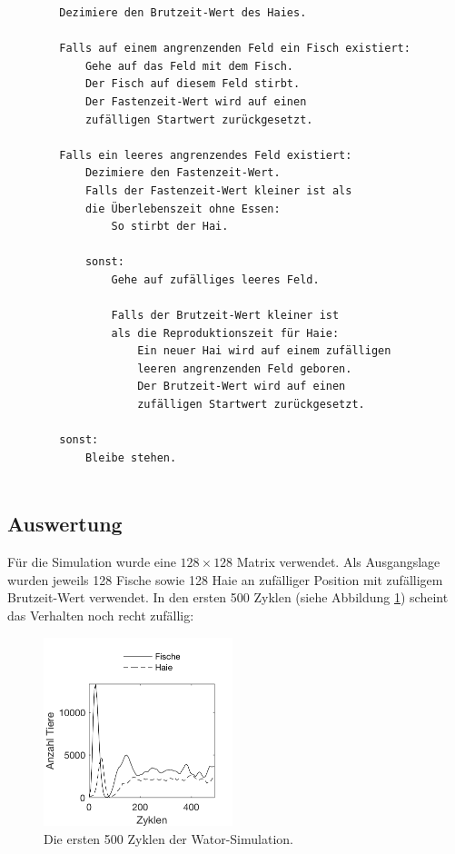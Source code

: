 \documentclass[a4paper,twoside]{article}
\begin{document}
	\begin{small}
	\begin{verbatim}
		Dezimiere den Brutzeit-Wert des Haies.
		
		Falls auf einem angrenzenden Feld ein Fisch existiert:
		    Gehe auf das Feld mit dem Fisch.
		    Der Fisch auf diesem Feld stirbt.
		    Der Fastenzeit-Wert wird auf einen
		    zufälligen Startwert zurückgesetzt.
		    
		Falls ein leeres angrenzendes Feld existiert:
		    Dezimiere den Fastenzeit-Wert.
		    Falls der Fastenzeit-Wert kleiner ist als 
		    die Überlebenszeit ohne Essen:
		        So stirbt der Hai.
		        
		    sonst:
		        Gehe auf zufälliges leeres Feld.
		        
		        Falls der Brutzeit-Wert kleiner ist
		        als die Reproduktionszeit für Haie:
		            Ein neuer Hai wird auf einem zufälligen
		            leeren angrenzenden Feld geboren.
		            Der Brutzeit-Wert wird auf einen
		            zufälligen Startwert zurückgesetzt.
		
		sonst:
		    Bleibe stehen. 
		
	\end{verbatim}
	\end{small}
	
	\newpage
	
	\subsection{Auswertung}
	Für die Simulation wurde eine \(128 \times 128\) Matrix verwendet. Als Ausgangslage wurden jeweils 128 Fische sowie 128 Haie an zufälliger Position mit zufälligem Brutzeit-Wert verwendet. In den ersten 500 Zyklen (siehe Abbildung \ref{fig:wator_diagram_100}) scheint das Verhalten noch recht zufällig:
	\begin{figure}[!h]
  		\centering
 		\includegraphics[width=5.5cm]{Diagramme/wator_diagram_100.png}
  		\caption{Die ersten 500 Zyklen der Wator-Simulation.}
  		\label{fig:wator_diagram_100}
	\end{figure}
	
\end{document}
